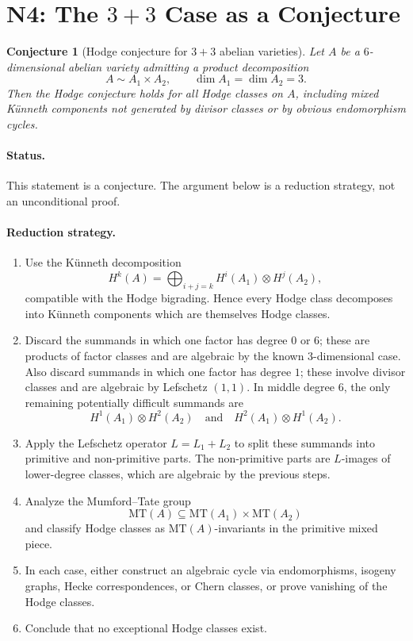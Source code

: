 \documentclass{article}
\newtheorem{conjecture}{Conjecture}
\begin{document}
\section*{N4: The \(3+3\) Case as a Conjecture}

\begin{conjecture}[Hodge conjecture for \(3+3\) abelian varieties]
Let \(A\) be a \(6\)-dimensional abelian variety admitting a product decomposition
\[
A \sim A_1 \times A_2,
\qquad
\dim A_1 = \dim A_2 = 3.
\]
Then the Hodge conjecture holds for all Hodge classes on \(A\), including mixed K\"unneth components not generated by divisor classes or by obvious endomorphism cycles.
\end{conjecture}

\paragraph{Status.}
This statement is a conjecture. The argument below is a reduction strategy, not an unconditional proof.

\paragraph{Reduction strategy.}
\begin{enumerate}
  \item Use the K\"unneth decomposition
  \[
  H^k(A) = \bigoplus_{i+j=k} H^i(A_1) \otimes H^j(A_2),
  \]
  compatible with the Hodge bigrading. Hence every Hodge class decomposes into K\"unneth components which are themselves Hodge classes.

  \item Discard the summands in which one factor has degree \(0\) or \(6\); these are products of factor classes and are algebraic by the known \(3\)-dimensional case. Also discard summands in which one factor has degree \(1\); these involve divisor classes and are algebraic by Lefschetz \((1,1)\). In middle degree \(6\), the only remaining potentially difficult summands are
  \[
  H^1(A_1) \otimes H^2(A_2)
  \quad\text{and}\quad
  H^2(A_1) \otimes H^1(A_2).
  \]

  \item Apply the Lefschetz operator \(L = L_1 + L_2\) to split these summands into primitive and non-primitive parts. The non-primitive parts are \(L\)-images of lower-degree classes, which are algebraic by the previous steps.

  \item Analyze the Mumford--Tate group
  \[
  \mathrm{MT}(A) \subseteq \mathrm{MT}(A_1) \times \mathrm{MT}(A_2)
  \]
  and classify Hodge classes as \(\mathrm{MT}(A)\)-invariants in the primitive mixed piece.

  \item In each case, either construct an algebraic cycle via endomorphisms, isogeny graphs, Hecke correspondences, or Chern classes, or prove vanishing of the Hodge classes.

  \item Conclude that no exceptional Hodge classes exist.
\end{enumerate}
\end{document}
